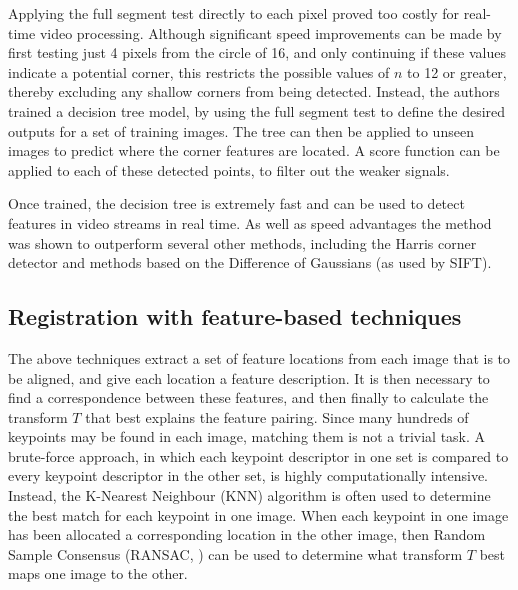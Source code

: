 \documentclass{report}
\begin{document}
Applying the full segment test directly to each pixel proved too costly for real-time video processing. Although significant speed improvements can be made by first testing just 4 pixels from the circle of 16, and only continuing if these values indicate a potential corner, this restricts the possible values of $n$ to 12 or greater, thereby excluding any shallow corners from being detected. Instead, the authors trained a decision tree model, by using the full segment test to define the desired outputs for a set of training images. The tree can then be applied to unseen images to predict where the corner features are located. A score function can be applied to each of these detected points, to filter out the weaker signals.

Once trained, the decision tree is extremely fast and can be used to detect features in video streams in real time. As well as speed advantages the method was shown to outperform several other methods, including the Harris corner detector and methods based on the Difference of Gaussians (as used by SIFT).

%

\subsection{Registration with feature-based techniques}
The above techniques extract a set of feature locations from each image that is to be aligned, and give each location a feature description. It is then necessary to find a correspondence between these features, and then finally to calculate the transform $T$ that best explains the feature pairing. Since many hundreds of keypoints may be found in each image, matching them is not a trivial task. A brute-force approach, in which each keypoint descriptor in one set is compared to every keypoint descriptor in the other set, is highly computationally intensive. Instead, the K-Nearest Neighbour (KNN) algorithm is often used to determine the best match for each keypoint in one image. When each keypoint in one image has been allocated a corresponding location in the other image, then Random Sample Consensus (RANSAC, \cite{fischler1981random}) can be used to determine what transform $T$ best maps one image to the other.
\end{document}

